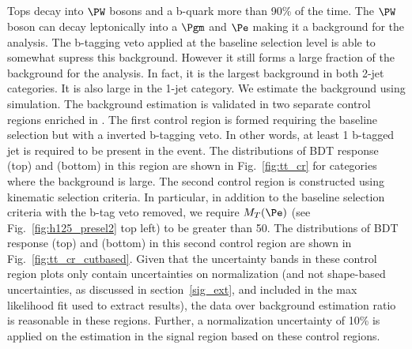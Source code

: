 \subsection{\ttb}
\label{h125_ttb}
Tops decay into $\PW$ bosons and a b-quark more than 90\% of the time. The $\PW$ boson can decay leptonically into a $\Pgm$ and $\Pe$ making it a background for the analysis. The b-tagging veto applied at the baseline selection level is able to somewhat supress this background. However it still forms a large fraction of the background for the analysis. In fact, it is the largest background in both 2-jet categories. It is also large in the 1-jet category. We estimate the \ttb background using simulation. The background estimation is validated in two separate control regions enriched in \ttb. The first control region is formed requiring the baseline selection but with a inverted b-tagging veto. In other words, at least 1 b-tagged jet is required to be present in the event. The distributions of BDT response (top) and \mcol (bottom) in this region are shown in Fig.~\ref{fig:tt_cr} for categories where the \ttb background is large. The second control region is constructed using kinematic selection criteria. In particular, in addition to the baseline selection criteria with the b-tag veto removed, we require $M_T(\Pe)$ (see Fig.~\ref{fig:h125_presel2} top left) to be greater than 50\GeV. The distributions of BDT response (top) and \mcol (bottom) in this second control region are shown in Fig.~\ref{fig:tt_cr_cutbased}. Given that the uncertainty bands in these control region plots only contain uncertainties on normalization (and not shape-based uncertainties, as discussed in section~\ref{sig_ext}, and included in the max likelihood fit used to extract results), the data over background estimation  ratio is reasonable in these regions. Further, a normalization uncertainty of 10\% is applied on the \ttb estimation in the signal region based on these control regions.


